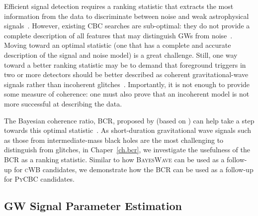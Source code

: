 Efficient signal detection requires a ranking statistic that extracts the most information from the data to discriminate between noise and weak astrophysical signals~\cite{bci, bayeswave_as_followup, bcr_paper, bootstrap_gw, bcr_gw151216,bcr_gw151216, bayesian_odds}.  
However, existing CBC searches are sub-optimal: they do not provide a complete description of all features that may distinguish GWs from noise~\cite{bci}. 
Moving toward an optimal statistic (one that has a complete and accurate description of the signal and noise model) is a great challenge. 
Still, one way toward a better ranking statistic may be to demand that foreground triggers in two or more detectors should be better described as coherent gravitational-wave signals rather than incoherent glitches~\cite{bci}.
Importantly, it is not enough to provide some measure of coherence: one must also prove that an incoherent model is not more successful at describing the data. 

The Bayesian coherence ratio, \textsc{BCR}, proposed by \citet{bcr_paper} (based on \citet{bci}) can help take a step towards this optimal statistic~\cite{bci, bayeswave_as_followup, bcr_paper, bootstrap_gw, bcr_gw151216,bcr_gw151216, bayesian_odds}. 
As short-duration gravitational wave signals such as those from intermediate-mass black holes are the most challenging to distinguish from glitches, in Chaper~\ref{ch.bcr}, we investigate the usefulness of the \textsc{BCR} as a ranking statistic. 
Similar to how \textsc{BayesWave} can be used as a follow-up for \textsc{cWB} candidates, we demonstrate how the \textsc{BCR} can be used as a follow-up for \textsc{PyCBC} candidates. 

\subsection{GW Signal Parameter Estimation}

